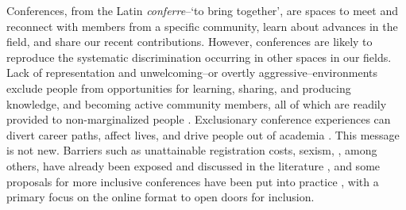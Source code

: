 \documentclass[10pt,letterpaper]{article}
\begin{document}
Conferences, from the Latin \textit{conferre}--`to bring together', are spaces to meet and reconnect with members from a specific community, learn about advances in the field, and share our recent contributions.
However, conferences are likely to reproduce the systematic discrimination occurring in other spaces in our fields. 
Lack of representation and unwelcoming--or overtly aggressive--environments exclude people from opportunities for learning, sharing, and producing knowledge, and becoming active community members, all of which are readily provided to non-marginalized people \cite{hendersonThoughtfulGatheringsGendering2020}.
Exclusionary conference experiences can divert career paths, affect lives, and drive people out of academia \cite{biggsAcademicConferenceChilly2018, hendersonThoughtfulGatheringsGendering2020}. 
This message is not new. 
Barriers such as unattainable registration costs, sexism, , among others, have already been exposed and discussed in the literature \cite{arendDisparityConferenceRegistration2019, biggsAcademicConferenceChilly2018, depickerRethinkingInclusionDisability2020a, irishIncreasingParticipationUsing2020}, 
and some proposals for more inclusive conferences have been put into practice \cite{gichoraTenSimpleRules2010a, levitisCenteringInclusivityDesign2021, atkinsonJournalMedicine20202021, foramittiVirtuesVirtualConferences2021, ninerBetterWhomLeveling2021, rabyMovingAcademicConferences2021, noauthor_discover2021}, with a primary focus on the online format to open doors for inclusion. %
\end{document}
